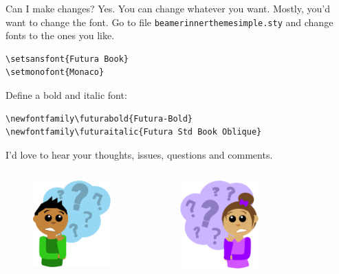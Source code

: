 \documentclass[xetex, aspectratio=169,professionalfont]{beamer}
\begin{document}
\begin{frame}[fragile]{Can I make changes?}
Yes. You can change whatever you want. Mostly, you'd want to change the font. Go to file \verb|beamerinnerthemesimple.sty| and change fonts to the ones you like.
\begin{verbatim}
\setsansfont{Futura Book}
\setmonofont{Monaco}
\end{verbatim}
Define a bold and italic font:
\begin{verbatim}
\newfontfamily\futurabold{Futura-Bold}
\newfontfamily\futuraitalic{Futura Std Book Oblique}
\end{verbatim}
\end{frame}

\begin{frame}
	\vspace{2\baselineskip}
\end{frame}

\begin{frame}
\centering 
\alert{I'd love to hear your thoughts, issues, questions and comments.}
\begin{columns}
	\begin{figure}
		\includegraphics[width=3cm]{img/questionguy}
	\end{figure}
		\begin{figure}
		\includegraphics[width=3cm]{img/questiongirl}
	\end{figure}
\end{columns}
\end{frame}
\end{document}
